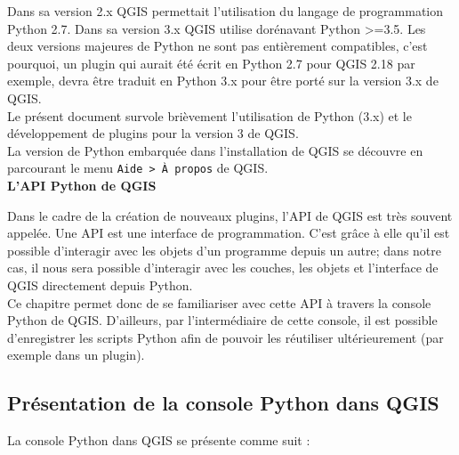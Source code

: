 \documentclass[11pt]{article}
\begin{document}
Dans sa version 2.x QGIS permettait l'utilisation du langage de programmation Python 2.7.
Dans sa version 3.x QGIS utilise dorénavant Python >=3.5.
Les deux versions majeures de Python ne sont pas entièrement compatibles, c'est pourquoi, un plugin qui aurait été écrit en Python 2.7 pour QGIS 2.18 par exemple, devra être traduit en Python 3.x pour être porté sur la version 3.x de QGIS.\\

Le présent document survole brièvement l'utilisation de Python (3.x) et le développement de plugins pour la version 3 de QGIS. \\
La version de Python embarquée dans l'installation de QGIS se découvre en parcourant le menu \og{}\texttt{Aide > À propos}\fg{} de QGIS.\\


\textbf{L'API Python de QGIS}\\\vspace*{-0.4em}

Dans le cadre de la création de nouveaux plugins, l'API de QGIS est très souvent appelée. Une API est une interface de programmation. C'est grâce à elle qu'il est possible d'interagir avec les objets d'un programme depuis un autre; dans notre cas, il nous sera possible d'interagir avec les couches, les objets et l'interface de QGIS directement depuis Python. \\

Ce chapitre permet donc de se familiariser avec cette API à travers la console Python de QGIS. D'ailleurs, par l'intermédiaire de cette console, il est possible d'enregistrer les scripts Python afin de pouvoir les réutiliser ultérieurement (par exemple dans un plugin). 


\subsection{Présentation de la console Python dans QGIS}
\label{Presentation}

La console Python dans QGIS se présente comme suit :
\end{document}
